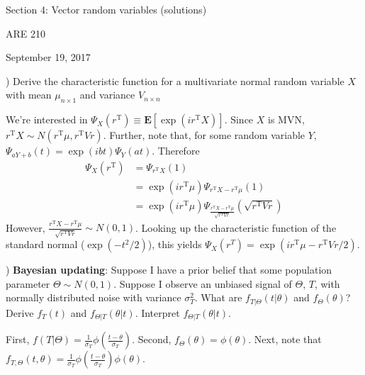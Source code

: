 \documentclass[12pt,english]{article}
\newcommand{\T}{\ensuremath{\text{T}}}
\begin{document}
\begin{center}
{\Large{}Section 4: Vector random variables (solutions)}
\par\end{center}{\Large \par}

\begin{center}
ARE 210
\par\end{center}

\begin{center}
September 19, 2017
\par\end{center}

) Derive the characteristic function for a multivariate normal random variable $X$ with mean $\mu_{n \times 1}$ and variance $V_{n \times n}$
\vspace{1em}

We're interested in $\Psi_{X}(r^{\T}) \equiv \mathbf{E}[\exp(ir^{\T}X)]$. Since $X$ is MVN, $r^{\T} X \sim N(r^{\T} \mu, r^{\T} V r)$. Further, note that, for some random variable $Y$, $\Psi_{aY + b}(t) = \exp(ibt) \Psi_{Y}(at)$. Therefore
\begin{align*}
\Psi_{X}(r^{\T}) & = \Psi_{r^{\T}X}(1) \\
& = \exp(ir^{\T}\mu) \Psi_{r^{\T}X - r^{\T} \mu}(1) \\
& = \exp(ir^{\T}\mu) \Psi_{\frac{r^{\T}X - r^{\T} \mu}{\sqrt{r^{\T} V r}}}(\sqrt{r^{\T} V r})
\end{align*}
However, $\frac{r^{\T}X - r^{\T} \mu}{\sqrt{r^{\T} V r}} \sim N(0,1)$. Looking up the characteristic function of the standard normal ($\exp(-t^{2} / 2)$), this yields $\Psi_{X}(r^{T}) = \exp(ir^{\T}\mu - r^{\T} V r / 2)$.

\vspace{1em}
) \textbf{Bayesian updating}: Suppose I have a prior belief that some population parameter $\Theta \sim N(0, 1)$. Suppose I observe an unbiased signal of $\Theta$, $T$, with normally distributed noise with variance $\sigma^{2}_{T}$. What are $f_{T | \Theta}(t | \theta)$ and $f_{\Theta}(\theta)$? Derive $f_{T}(t)$ and $f_{\Theta | T}(\theta | t)$. Interpret $f_{\Theta | T}(\theta | t)$.
\vspace{1em}

First, $f(T | \Theta) = \frac{1}{\sigma_{T}} \phi\left(\frac{t - \theta}{\sigma_{T}}\right)$. Second, $f_{\Theta}(\theta) = \phi \left( \theta \right)$. Next, note that $f_{T, \Theta}(t, \theta) = \frac{1}{\sigma_{T}} \phi\left(\frac{t - \theta}{\sigma_{T}}\right) \phi \left( \theta \right)$.
\end{document}
